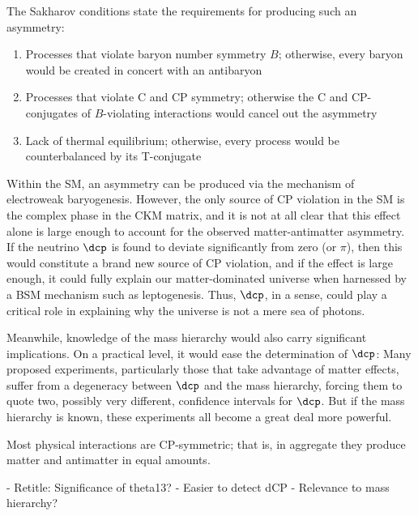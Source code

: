 \documentclass[../thesis.tex]{subfiles}
\begin{document}
The Sakharov conditions state the requirements for producing such an asymmetry:
\begin{enumerate}
\item Processes that violate baryon number symmetry $B$; otherwise, every baryon
  would be created in concert with an antibaryon
\item Processes that violate C and CP symmetry; otherwise the C and
  CP-conjugates of $B$-violating interactions would cancel out the asymmetry
\item Lack of thermal equilibrium; otherwise, every process would be
  counterbalanced by its T-conjugate
\end{enumerate}
Within the SM, an asymmetry can be produced via the mechanism of electroweak
baryogenesis. However, the only source of CP violation in the SM is the complex
phase in the CKM matrix, and it is not at all clear that this effect alone is
large enough to account for the observed matter-antimatter asymmetry. If the
neutrino $\dcp$ is found to deviate significantly from zero (or $\pi$), then this
would constitute a brand new source of CP violation, and if the effect is large
enough, it could fully explain our matter-dominated universe when harnessed by a
BSM mechanism such as leptogenesis. Thus, $\dcp$, in a sense, could play a
critical role in explaining why the universe is not a mere sea of photons.

Meanwhile, knowledge of the mass hierarchy would also carry significant
implications. On a practical level, it would ease the determination of $\dcp$:
Many proposed experiments, particularly those that take advantage of matter
effects, suffer from a degeneracy between $\dcp$ and the mass hierarchy, forcing
them to quote two, possibly very different, confidence intervals for $\dcp$. But
if the mass hierarchy is known, these experiments all become a great deal more
powerful. 

Most physical
interactions are CP-symmetric; that is, in aggregate they produce matter and
antimatter in equal amounts.

- Retitle: Significance of theta13?
- Easier to detect dCP
- Relevance to mass hierarchy?
\end{document}

